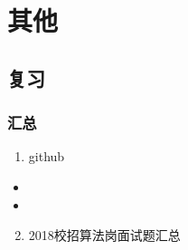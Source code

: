 \documentclass[letterpaper,10pt,english]{sphinxmanual}
\begin{document}
\chapter{其他}
\label{\detokenize{else/index::doc}}\label{\detokenize{else/index:id1}}

\section{复习}
\label{\detokenize{else/01_interview::doc}}\label{\detokenize{else/01_interview:id1}}

\subsection{汇总}
\label{\detokenize{else/01_interview:id2}}\begin{enumerate}
\item {} 
github

\end{enumerate}
\begin{itemize}
\item {} 

\item {} 

\end{itemize}
\begin{enumerate}
\setcounter{enumi}{1}
\item {} 
2018校招算法岗面试题汇总

\end{enumerate}
\begin{quote}

\end{quote}
\end{document}

